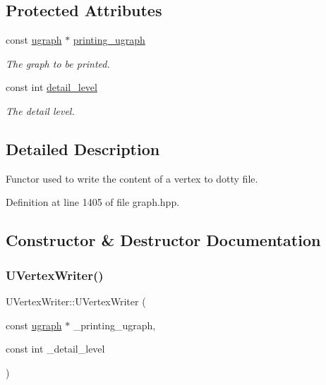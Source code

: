 \subsection*{Protected Attributes}
\begin{DoxyCompactItemize}
\item 
const \hyperlink{structugraph}{ugraph} $\ast$ \hyperlink{classUVertexWriter_a3383b5249bed731ea5a4728624fb03bc}{printing\+\_\+ugraph}
\begin{DoxyCompactList}\small\item\em The graph to be printed. \end{DoxyCompactList}\item 
const int \hyperlink{classUVertexWriter_af32b2c1e4d60e66c0ead7fc6582d6291}{detail\+\_\+level}
\begin{DoxyCompactList}\small\item\em The detail level. \end{DoxyCompactList}\end{DoxyCompactItemize}


\subsection{Detailed Description}
Functor used to write the content of a vertex to dotty file. 

Definition at line 1405 of file graph.\+hpp.



\subsection{Constructor \& Destructor Documentation}
\mbox{\label{classUVertexWriter_adbded0aed103a0e27e48b7f84a471dbf}} 
\subsubsection{\texorpdfstring{U\+Vertex\+Writer()}{UVertexWriter()}}
{\footnotesize\ttfamily U\+Vertex\+Writer\+::\+U\+Vertex\+Writer (\begin{DoxyParamCaption}\item[{const \hyperlink{structugraph}{ugraph} $\ast$}]{\+\_\+printing\+\_\+ugraph,  }\item[{const int}]{\+\_\+detail\+\_\+level }\end{DoxyParamCaption})\hspace{0.3cm}{\ttfamily [inline]}}



